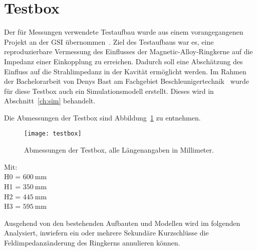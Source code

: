 \section{Testbox}
\label{sec:testbox}
Der f\"ur Messungen verwendete Testaufbau wurde aus einem vorangegangenen Projekt an der GSI \"ubernommen~\cite{harzheim2016modeling}. Ziel des Testaufbaus war es, eine reproduzierbare Vermessung des Einflusses der Magnetic-Alloy-Ringkerne auf die Impedanz einer Einkopplung zu erreichen. Dadurch soll eine Absch\"atzung des Einfluss auf die Strahlimpedanz in der Kavit\"at erm\"oglicht werden. Im Rahmen der Bachelorarbeit von Denys Bast am Fachgebiet Beschleunigertechnik~\cite{bast2017ba} wurde f\"ur diese Testbox auch ein Simulationsmodell erstellt. Dieses wird in Abschnitt~\ref{ch:sim} behandelt. 
\par
Die Abmessungen der Testbox sind Abbildung~\ref{fig:boxdimensions} zu entnehmen.
\par
\begin{figure}[htb]
	\centering
	\texttt{[image: testbox]}
	\caption{Abmessungen der Testbox, alle L\"angenangaben in Millimeter.}
	\label{fig:boxdimensions}
\end{figure}
Mit:\\
H0 = $\SI{600}{\milli\meter}$\\
H1 = $\SI{350}{\milli\meter}$\\
H2 = $\SI{445}{\milli\meter}$\\
H3 = $\SI{595}{\milli\meter}$


\par
Ausgehend von den bestehenden Aufbauten und Modellen wird im folgenden Analysiert, inwiefern ein oder mehrere Sekund\"are Kurzschl\"usse die Feldimpedanz\"anderung des Ringkerns annulieren k\"onnen. 


\newpage


